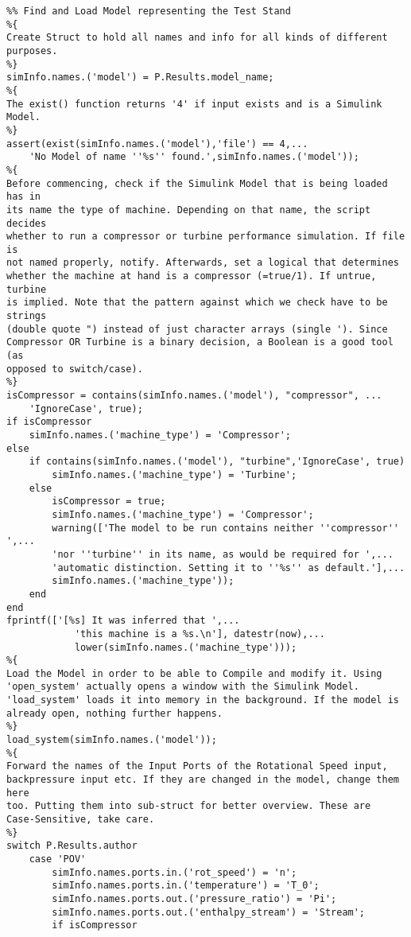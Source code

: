 \begin{lstlisting}
%% Find and Load Model representing the Test Stand
%{
Create Struct to hold all names and info for all kinds of different
purposes.
%}
simInfo.names.('model') = P.Results.model_name;
%{
The exist() function returns '4' if input exists and is a Simulink Model.
%}
assert(exist(simInfo.names.('model'),'file') == 4,...
    'No Model of name ''%s'' found.',simInfo.names.('model'));
%{
Before commencing, check if the Simulink Model that is being loaded has in
its name the type of machine. Depending on that name, the script decides
whether to run a compressor or turbine performance simulation. If file is
not named properly, notify. Afterwards, set a logical that determines
whether the machine at hand is a compressor (=true/1). If untrue, turbine
is implied. Note that the pattern against which we check have to be strings
(double quote ") instead of just character arrays (single '). Since
Compressor OR Turbine is a binary decision, a Boolean is a good tool (as
opposed to switch/case).
%}
isCompressor = contains(simInfo.names.('model'), "compressor", ...
    'IgnoreCase', true);
if isCompressor
    simInfo.names.('machine_type') = 'Compressor';
else
    if contains(simInfo.names.('model'), "turbine",'IgnoreCase', true)
        simInfo.names.('machine_type') = 'Turbine';
    else
        isCompressor = true;
        simInfo.names.('machine_type') = 'Compressor';        
        warning(['The model to be run contains neither ''compressor'' ',...
        'nor ''turbine'' in its name, as would be required for ',...
        'automatic distinction. Setting it to ''%s'' as default.'],...
        simInfo.names.('machine_type'));
    end
end
fprintf(['[%s] It was inferred that ',...
            'this machine is a %s.\n'], datestr(now),...
            lower(simInfo.names.('machine_type')));
%{
Load the Model in order to be able to Compile and modify it. Using
'open_system' actually opens a window with the Simulink Model.
'load_system' loads it into memory in the background. If the model is
already open, nothing further happens.
%}
load_system(simInfo.names.('model'));
%{
Forward the names of the Input Ports of the Rotational Speed input,
backpressure input etc. If they are changed in the model, change them here
too. Putting them into sub-struct for better overview. These are
Case-Sensitive, take care.
%}
switch P.Results.author
    case 'POV'
        simInfo.names.ports.in.('rot_speed') = 'n';
        simInfo.names.ports.in.('temperature') = 'T_0';
        simInfo.names.ports.out.('pressure_ratio') = 'Pi';
        simInfo.names.ports.out.('enthalpy_stream') = 'Stream';
        if isCompressor

\end{lstlisting}
